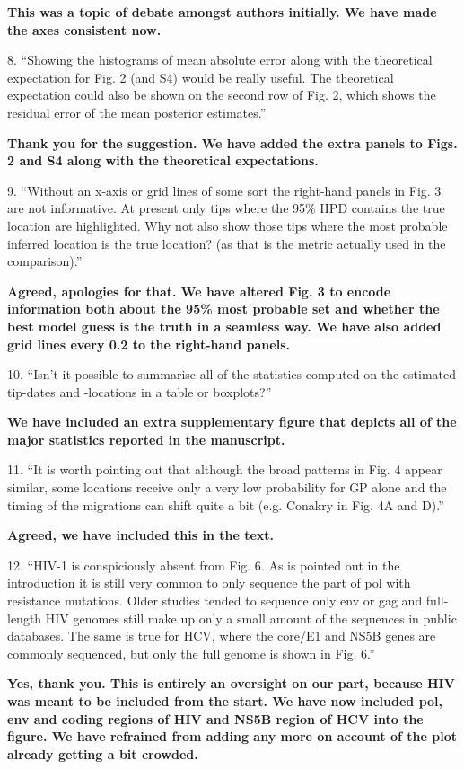 \documentclass[11pt,oneside,letterpaper]{article}
\begin{document}
\textbf{This was a topic of debate amongst authors initially. We have made the axes consistent now.}

8. ``Showing the histograms of mean absolute error along with the theoretical expectation for Fig. 2 (and S4) would be really useful. The theoretical expectation could also be shown on the second row of Fig. 2, which shows the residual error of the mean posterior estimates.''

\textbf{Thank you for the suggestion. We have added the extra panels to Figs. 2 and S4 along with the theoretical expectations.}

9. ``Without an x-axis or grid lines of some sort the right-hand panels in Fig. 3 are not informative. At present only tips where the 95\% HPD contains the true location are highlighted. Why not also show those tips where the most probable inferred location is the true location? (as that is the metric actually used in the comparison).''

\textbf{Agreed, apologies for that. We have altered Fig. 3 to encode information both about the 95\% most probable set and whether the best model guess is the truth in a seamless way. We have also added grid lines every 0.2 to the right-hand panels.}

10. ``Isn't it possible to summarise all of the statistics computed on the estimated tip-dates and -locations in a table or boxplots?''

\textbf{We have included an extra supplementary figure that depicts all of the major statistics reported in the manuscript.}

11. ``It is worth pointing out that although the broad patterns in Fig. 4 appear similar, some locations receive only a very low probability for GP alone and the timing of the migrations can shift quite a bit (e.g. Conakry in Fig. 4A and D).''

\textbf{Agreed, we have included this in the text.}

12. ``HIV-1 is conspiciously absent from Fig. 6. As is pointed out in the introduction it is still very common to only sequence the part of pol with resistance mutations. Older studies tended to sequence only env or gag and full-length HIV genomes still make up only a small amount of the sequences in public databases. The same is true for HCV, where the core/E1 and NS5B genes are commonly sequenced, but only the full genome is shown in Fig. 6.''

\textbf{Yes, thank you. This is entirely an oversight on our part, because HIV was meant to be included from the start. We have now included pol, env and coding regions of HIV and NS5B region of HCV into the figure. We have refrained from adding any more on account of the plot already getting a bit crowded.}
\end{document}

